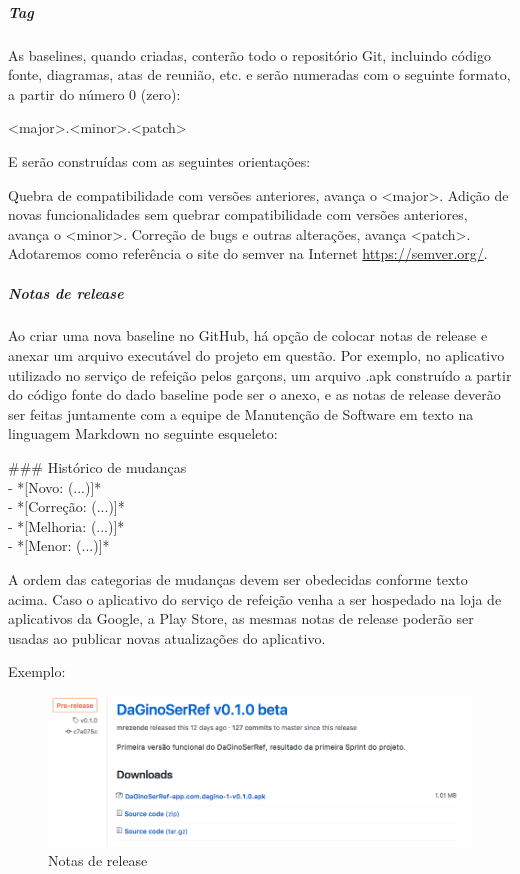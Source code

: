 \subparagraph{Tag}

As baselines, quando criadas, conterão todo o repositório Git, incluindo código fonte, diagramas, atas de reunião, etc. e serão numeradas com o seguinte formato, a partir do número 0 (zero):

\begin{myprop}
<major>.<minor>.<patch>
\end{myprop}

E serão construídas com as seguintes orientações:

Quebra de compatibilidade com versões anteriores, avança o <major>.
Adição de novas funcionalidades sem quebrar compatibilidade com versões anteriores, avança o <minor>.
Correção de bugs e outras alterações, avança <patch>.
Adotaremos como referência o site do semver na Internet \url{https://semver.org/}.

\subparagraph{Notas de release}

Ao criar uma nova baseline no GitHub, há opção de colocar notas de release e anexar um arquivo executável do projeto em questão. Por exemplo, no aplicativo utilizado no serviço de refeição pelos garçons, um arquivo .apk construído a partir do código fonte do dado baseline pode ser o anexo, e as notas de release deverão ser feitas juntamente com a equipe de Manutenção de Software em texto na linguagem Markdown no seguinte esqueleto:

\begin{myprop}
\#\#\# Histórico de mudanças \\
- *[Novo: (...)]* \\
- *[Correção: (...)]* \\
- *[Melhoria: (...)]* \\
- *[Menor: (...)]* 
\end{myprop}

A ordem das categorias de mudanças devem ser obedecidas conforme texto acima. Caso o aplicativo do serviço de refeição venha a ser hospedado na loja de aplicativos da Google, a Play Store, as mesmas notas de release poderão ser usadas ao publicar novas atualizações do aplicativo.

Exemplo:

\begin{figure}[H]
  \centering
  \includegraphics[width=1\textwidth]{softwareengineer/images/releases-notes} 
  \caption{Notas de release}
  \label{fig:release-notes} 
\end{figure}


